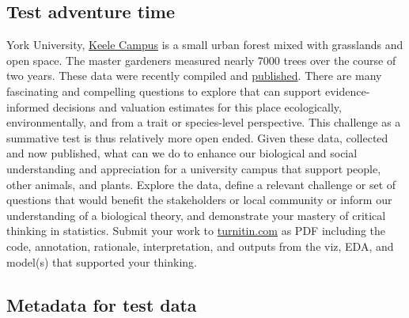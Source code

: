 \documentclass[
]{book}
\begin{document}
\hypertarget{test-adventure-time}{%
\subsection*{Test adventure time}\label{test-adventure-time}}

York University, \href{https://en.wikipedia.org/wiki/Keele_Campus_(York_University)}{Keele Campus} is a small urban forest mixed with grasslands and open space. The master gardeners measured nearly 7000 trees over the course of two years. These data were recently compiled and \href{https://knb.ecoinformatics.org/view/doi\%3A10.5063\%2FQ81BGH}{published}. There are many fascinating and compelling questions to explore that can support evidence-informed decisions and valuation estimates for this place ecologically, environmentally, and from a trait or species-level perspective. This challenge as a summative test is thus relatively more open ended. Given these data, collected and now published, what can we do to enhance our biological and social understanding and appreciation for a university campus that support people, other animals, and plants. Explore the data, define a relevant challenge or set of questions that would benefit the stakeholders or local community or inform our understanding of a biological theory, and demonstrate your mastery of critical thinking in statistics. Submit your work to \href{https://www.turnitin.com}{turnitin.com} as PDF including the code, annotation, rationale, interpretation, and outputs from the viz, EDA, and model(s) that supported your thinking.

\hypertarget{metadata-for-test-data}{%
\subsection*{Metadata for test data}\label{metadata-for-test-data}}
\end{document}

